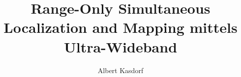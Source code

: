 \documentclass[11pt,a4paper,twoside,titlepage,openright,ngerman]{scrbook}
\title{Range-Only Simultaneous Localization and Mapping mittels Ultra-Wideband}
\author{Albert Kasdorf}
\begin{document}
	\frontmatter
 
	
	\cleardoublepage
	

	
	\tableofcontents
	
	\listoffigures
	\listoftables
	
	\mainmatter
	
	
	
	
	
	
	
	
	\cleardoublepage

%
%
%
	\nocite{mcelroy2014comparison}
	\nocite{herranz2014comparison}
	\nocite{gonzalez2009mobile}
	\nocite{durrant2006simultaneous}
	\nocite{thrun2005probabilistic}
	\nocite{schroeder2005low}
	\nocite{smith2004tracking}
	\printbibliography[heading=bibintoc,title={Literaturverzeichnis}]
	\cleardoublepage

	

	\backmatter
\end{document}
